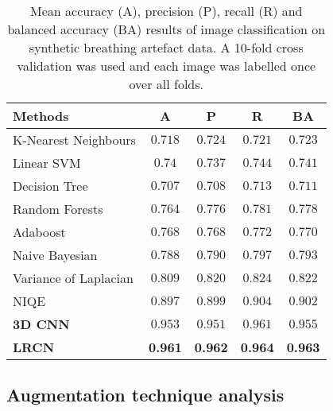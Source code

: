 \documentclass[preprint,12pt,authoryear]{elsarticle}
\begin{document}
\begin{table}

\centering
\caption{Mean  accuracy (A), precision (P), recall (R) and balanced accuracy (BA) results of image classification on synthetic breathing artefact data. A 10-fold cross validation was used and each image was labelled once over all folds.}
\begin{tabular}{lcccc}
\hline
Methods    & A & P & R  & BA\\
\hline

K-Nearest Neighbours  & $0.718$  & $0.724$  & $0.721$    & $0.723$     \\
Linear SVM    & $ 0.74 $  & $0.737$  & $0.744$  & $0.741$   \\
Decision Tree   &   $ 0.707 $  & $0.708$  & $0.713$  & $0.711$   \\
Random Forests   & $0.764$    & $0.776$  & $0.781$   & $0.778$  \\
Adaboost   & $0.768 $  & $0.768$  & $0.772$       & $0.770$   \\
Naive Bayesian   & $0.788 $  & $0.790$  & $0.797$    & $0.793$     \\
Variance of Laplacian  & $0.809$  & $0.820$ & $0.824$   & $0.822$   \\
NIQE \citep{Mittal2013}  & $0.897$  & $0.899 $& $0.904$  & $0.902$     \\
\hline

\textbf{3D CNN}    & $0.953$ & $0.951$ & $0.961$ &  $0.955$     \\
\textbf{LRCN}   & \textbf{0.961} & \textbf{0.962} & \textbf{0.964} &  \textbf{0.963}     \\

\hline
\end{tabular}
\label{table:synbreath}
\end{table}



\subsection{Augmentation technique analysis}
\label{sec:Quantitative}
\end{document}
